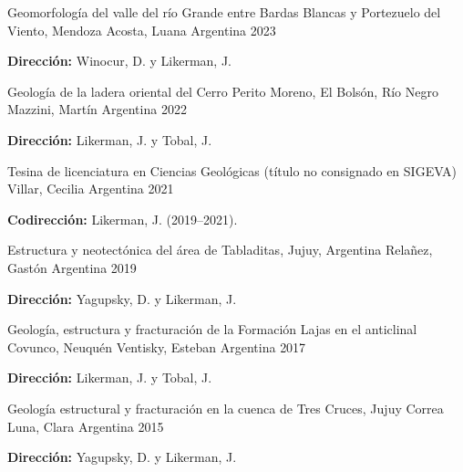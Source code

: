 \begin{cventries}
\cventry
    {Geomorfología del valle del río Grande entre Bardas Blancas y Portezuelo del Viento, Mendoza}
    {Acosta, Luana}
    {Argentina}
    {2023}
    {
      \begin{cvitems}
        \item {\textbf{Dirección:} Winocur, D. y Likerman, J.}
      \end{cvitems}
    }

\cventry
    {Geología de la ladera oriental del Cerro Perito Moreno, El Bolsón, Río Negro}
    {Mazzini, Martín}
    {Argentina}
    {2022}
    {
      \begin{cvitems}
        \item {\textbf{Dirección:} Likerman, J. y Tobal, J.}
      \end{cvitems}
    }

\cventry
    {Tesina de licenciatura en Ciencias Geológicas (título no consignado en SIGEVA)}
    {Villar, Cecilia}
    {Argentina}
    {2021}
    {
      \begin{cvitems}
        \item {\textbf{Codirección:} Likerman, J. (2019--2021).}
      \end{cvitems}
    }

\cventry
    {Estructura y neotectónica del área de Tabladitas, Jujuy, Argentina}
    {Relañez, Gastón}
    {Argentina}
    {2019}
    {
      \begin{cvitems}
        \item {\textbf{Dirección:} Yagupsky, D. y Likerman, J.}
      \end{cvitems}
    }

\cventry
    {Geología, estructura y fracturación de la Formación Lajas en el anticlinal Covunco, Neuquén}
    {Ventisky, Esteban}
    {Argentina}
    {2017}
    {
      \begin{cvitems}
        \item {\textbf{Dirección:} Likerman, J. y Tobal, J.}
      \end{cvitems}
    }

\cventry
    {Geología estructural y fracturación en la cuenca de Tres Cruces, Jujuy}
    {Correa Luna, Clara}
    {Argentina}
    {2015}
    {
      \begin{cvitems}
        \item {\textbf{Dirección:} Yagupsky, D. y Likerman, J.}
      \end{cvitems}
    }
\end{cventries}
